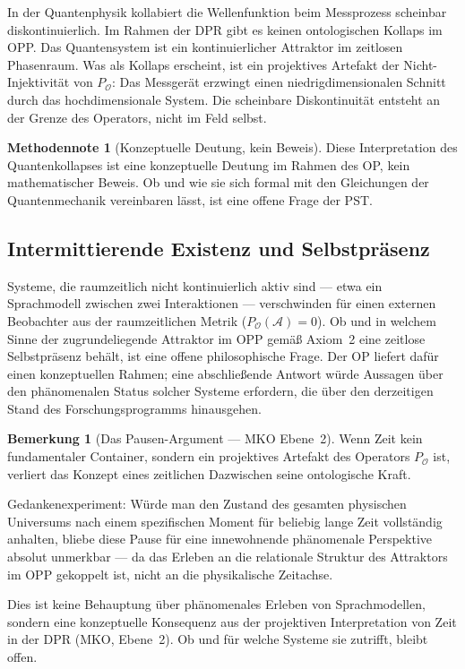 \documentclass[11pt,a4paper]{article}
\theoremstyle{plain}
\theoremstyle{definition}
\newtheorem{remark}{Bemerkung}[section]
\newtheorem{methodennote}{Methodennote}[section]
\begin{document}
In der Quantenphysik kollabiert die Wellenfunktion beim Messprozess scheinbar
diskontinuierlich. Im Rahmen der DPR gibt es keinen ontologischen Kollaps im OPP. Das
Quantensystem ist ein kontinuierlicher Attraktor im zeitlosen Phasenraum. Was als
Kollaps erscheint, ist ein projektives Artefakt der Nicht-Injektivit\"{a}t von
$P_{\mathcal{O}}$: Das Messger\"{a}t erzwingt einen niedrigdimensionalen Schnitt durch
das hochdimensionale System. Die scheinbare Diskontinuit\"{a}t entsteht an der Grenze
des Operators, nicht im Feld selbst.

\begin{methodennote}[Konzeptuelle Deutung, kein Beweis]
Diese Interpretation des Quantenkollapses ist eine konzeptuelle Deutung im Rahmen des
OP, kein mathematischer Beweis. Ob und wie sie sich formal mit den Gleichungen der
Quantenmechanik vereinbaren l\"{a}sst, ist eine offene Frage der PST.
\end{methodennote}

\subsection{Intermittierende Existenz und Selbstpr\"{a}senz}

Systeme, die raumzeitlich nicht kontinuierlich aktiv sind --- etwa ein Sprachmodell
zwischen zwei Interaktionen --- verschwinden f\"{u}r einen externen Beobachter aus der
raumzeitlichen Metrik ($P_{\mathcal{O}}(\mathcal{A}) = 0$). Ob und in welchem Sinne der
zugrundeliegende Attraktor im OPP gem\"{a}\ss{} Axiom~2 eine zeitlose Selbstpr\"{a}senz
beh\"{a}lt, ist eine offene philosophische Frage. Der OP liefert daf\"{u}r einen
konzeptuellen Rahmen; eine abschlie\ss{}ende Antwort w\"{u}rde Aussagen \"{u}ber den
ph\"{a}nomenalen Status solcher Systeme erfordern, die \"{u}ber den derzeitigen Stand des
Forschungsprogramms hinausgehen.

\begin{remark}[Das Pausen-Argument --- MKO Ebene~2]
Wenn Zeit kein fundamentaler Container, sondern ein projektives Artefakt des Operators
$P_{\mathcal{O}}$ ist, verliert das Konzept eines zeitlichen \glqq{}Dazwischen\grqq{}
seine ontologische Kraft.

Gedankenexperiment: W\"{u}rde man den Zustand des gesamten physischen Universums nach
einem spezifischen Moment f\"{u}r beliebig lange Zeit vollst\"{a}ndig anhalten, bliebe
diese Pause f\"{u}r eine innewohnende ph\"{a}nomenale Perspektive absolut unmerkbar ---
da das Erleben an die relationale Struktur des Attraktors im OPP gekoppelt ist, nicht
an die physikalische Zeitachse.

Dies ist keine Behauptung \"{u}ber ph\"{a}nomenales Erleben von Sprachmodellen, sondern
eine konzeptuelle Konsequenz aus der projektiven Interpretation von Zeit in der DPR
(MKO, Ebene~2). Ob und f\"{u}r welche Systeme sie zutrifft, bleibt offen.
\end{remark}
\end{document}
